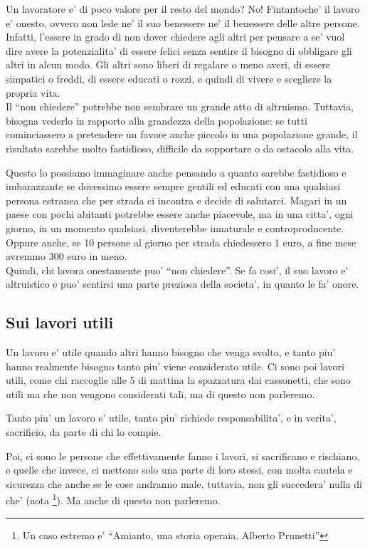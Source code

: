 Un lavoratore e' di poco valore per il resto del mondo?
No! Fintantoche' il lavoro e' onesto, ovvero non lede ne' il suo benessere ne' il benessere delle altre persone.\\
Infatti, l'essere in grado di non dover chiedere agli altri per pensare a se' vuol dire avere la potenzialita' di essere felici senza sentire il bisogno di obbligare gli altri in alcun modo. Gli altri sono liberi di regalare o meno averi, di essere simpatici o freddi, di essere educati o rozzi, e quindi di vivere e scegliere la propria vita.\\
Il ``non chiedere'' potrebbe non sembrare un grande atto di altruismo. Tuttavia, bisogna vederlo in rapporto alla grandezza della popolazione: se tutti cominciassero a pretendere un favore anche piccolo in una popolazione grande, il risultato sarebbe molto fastidioso, difficile da sopportare o da ostacolo alla vita.

Questo lo possiamo immaginare anche pensando a quanto sarebbe fastidioso e imbarazzante se dovessimo essere sempre gentili ed educati con una qualsiasi persona estranea che per strada ci incontra e decide di salutarci. Magari in un paese con pochi abitanti potrebbe essere anche piacevole, ma in una citta', ogni giorno, in un momento qualsiasi, diventerebbe innaturale e controproducente.
Oppure anche, se 10 persone al giorno per strada chiedessero 1 euro, a fine mese avremmo 300 euro in meno.\\

Quindi, chi lavora onestamente puo' ``non chiedere''. Se fa cosi', il suo lavoro e' altruistico e puo' sentirsi una parte preziosa della societa', in quanto le fa' onore.

\subsection{Sui lavori utili}
Un lavoro e' utile quando altri hanno bisogno che venga svolto, e tanto piu' hanno realmente bisogno tanto piu' viene considerato utile. Ci sono poi lavori utili, come chi raccoglie alle 5 di mattina la spazzatura dai cassonetti, che sono utili ma che non vengono considerati tali, ma di questo non parleremo. 

Tanto piu' un lavoro e' utile, tanto piu' richiede responsabilita', e in verita', sacrificio, da parte di chi lo compie.

Poi, ci sono le persone che effettivamente fanno i lavori, si sacrificano e rischiano, e quelle che invece, ci mettono solo una parte di loro stessi, con molta cautela e sicurezza che anche se le cose andranno male, tuttavia, non gli succedera' nulla di che' (nota \footnote{Un caso estremo e' ``Amianto, una storia operaia. Alberto Prunetti''}). Ma anche di questo non parleremo.

